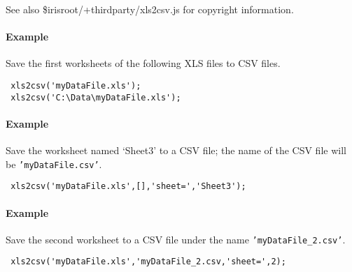  See also \$irisroot/+thirdparty/xls2csv.js for copyright information.
 
 \paragraph{Example}
 
 Save the first worksheets of the following XLS files to CSV files.
 
 \begin{verbatim}
 xls2csv('myDataFile.xls');
 xls2csv('C:\Data\myDataFile.xls');
 \end{verbatim}
 
 \paragraph{Example}
 
 Save the worksheet named `Sheet3' to a CSV file; the name of the CSV
 file will be \texttt{'myDataFile.csv'}.
 
 \begin{verbatim}
 xls2csv('myDataFile.xls',[],'sheet=','Sheet3');
 \end{verbatim}
 
 \paragraph{Example}
 
 Save the second worksheet to a CSV file under the name
 \texttt{'myDataFile\_2.csv'}.
 
 \begin{verbatim}
 xls2csv('myDataFile.xls','myDataFile_2.csv,'sheet=',2);
 \end{verbatim}


